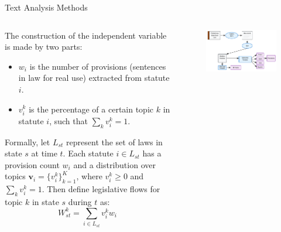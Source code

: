 \documentclass{beamer}
\begin{document}
\begin{frame}{Text Analysis Methods}
    \footnotesize
    \begin{columns}[T] %
        \begin{column}{0.5\textwidth} %
            The construction of the independent variable is made by two parts:
            \begin{itemize}
                \item $w_i$ is the number of provisions (sentences in law for real use) extracted from statute $i$.
                \item $v_i^k$ is the percentage of a certain topic $k$ in statute $i$, such that $\sum_k v_i^k = 1$.
            \end{itemize}
            Formally, let $L_{st}$ represent the set of laws in state $s$ at time $t$. Each statute $i \in L_{st}$ has a provision count $w_i$ and a distribution over topics $\mathbf{v}_i = \{v_i^k\}_{k=1}^K$, where $v_i^k \ge 0$ and $\sum_k v_i^k = 1$.
            Then define legislative flows for topic $k$ in state $s$ during $t$ as:
            \begin{equation*}
                W_{st}^k = \sum_{i \in L_{st}} v_i^k w_i
            \end{equation*}
        \end{column}
        \begin{column}{0.68\textwidth} %
            \vfill
            \begin{figure}
                \centering
                \includegraphics[width=\textwidth]{pic/fig4.pdf} %
            \end{figure}
            \vfill
        \end{column}
    \end{columns}
\end{frame}
\end{document}
